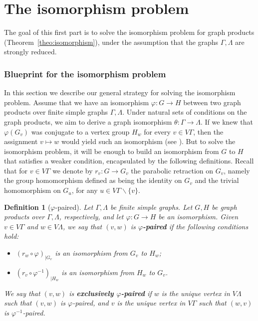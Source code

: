 \documentclass[a4paper,english,11pt]{article}
\newtheorem{de}{Definition}[section]
\theoremstyle{definition}
\theoremstyle{remark}
\newcommand{\deffont}[1]{\textbf{#1}}
\begin{document}
\part{The isomorphism problem}\label{part:isomorphism}
The goal of this first part is to solve the isomorphism problem for graph products (Theorem~\ref{theo:isomorphism}), under the assumption that the graphs $\Gamma,\Lambda$ are strongly reduced.

\section{Blueprint for the isomorphism problem}\label{sec:blueprint}

In this section we describe our general strategy for solving the isomorphism problem. Assume that we have an isomorphism $\varphi:G\to H$ between two graph products over finite simple graphs $\Gamma,\Lambda$. Under natural sets of conditions on the graph products, we aim to derive a graph isomorphism $\theta:\Gamma\to\Lambda$. If we knew that $\varphi(G_v)$ was conjugate to a vertex group $H_w$ for every $v\in V\Gamma$, then the assignment $v\mapsto w$ would yield such an isomorphism (see \cite[Theorem~3.11]{GM}). But to solve the isomorphism problem, it will be enough to build an isomorphism from $G$ to $H$ that satisfies a weaker condition, encapsulated by the following definitions.
Recall that for $v\in V\Gamma$ we denote by $r_v:G\rightarrow G_v$ the parabolic retraction on $G_v$, namely the group homomorphism defined as being the identity on $G_v$ and the trivial homomorphism on $G_u$, for any $u\in V\Gamma\backslash \{v\}$.

\begin{de}[$\varphi$-paired]\label{de:paired}
Let $\Gamma,\Lambda$ be finite simple graphs. Let $G,H$ be graph products over $\Gamma,\Lambda$, respectively, and let $\varphi:G\to H$ be an isomorphism. Given $v\in V\Gamma$ and $w\in V\Lambda$, we say that $(v,w)$ is \deffont{$\varphi$-paired} if the following conditions hold: 
\begin{itemize}
    \item $(r_w\circ\varphi)_{|G_v}$ is an isomorphism from $G_v$ to $H_w$;
    \item $(r_v\circ \varphi^{-1})_{|H_w}$ is an isomorphism from $H_w$ to $G_v$.
\end{itemize}
We say that $(v,w)$ is \deffont{exclusively $\varphi$-paired} if $w$ is the unique vertex in $V\Lambda$ such that $(v,w)$ is $\varphi$-paired, and $v$ is the unique vertex in $V\Gamma$ such that $(w,v)$ is $\varphi^{-1}$-paired. 
\end{de}
\end{document}
